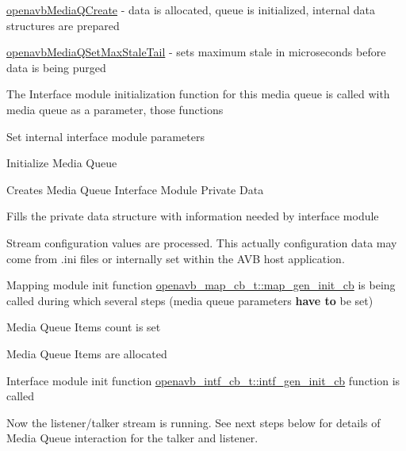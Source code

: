\begin{DoxyItemize}
\item \hyperlink{mediaq_2openavb__mediaq__pub_8h_ad9ac4896a82092d93fb4c21289497194}{openavb\+Media\+Q\+Create} -\/ data is allocated, queue is initialized, internal data structures are prepared
\item \hyperlink{mediaq_2openavb__mediaq__pub_8h_abb41c6d762035f1d5e74c91b5ed44f06}{openavb\+Media\+Q\+Set\+Max\+Stale\+Tail} -\/ sets maximum stale in microseconds before data is being purged
\item The Interface module initialization function for this media queue is called with media queue as a parameter, those functions
\begin{DoxyItemize}
\item Set internal interface module parameters
\item Initialize Media Queue
\begin{DoxyItemize}
\item Creates Media Queue Interface Module Private Data
\item Fills the private data structure with information needed by interface module
\end{DoxyItemize}
\end{DoxyItemize}
\item Stream configuration values are processed. This actually configuration data may come from .ini files or internally set within the A\+VB host application.
\item Mapping module init function \hyperlink{structopenavb__map__cb__t_ae2e9b66edaa11de03638bbcc5f8414bf}{openavb\+\_\+map\+\_\+cb\+\_\+t\+::map\+\_\+gen\+\_\+init\+\_\+cb} is being called during which several steps (media queue parameters {\bfseries have to} be set)
\begin{DoxyItemize}
\item Media Queue Items count is set
\item Media Queue Items are allocated
\end{DoxyItemize}
\item Interface module init function \hyperlink{structopenavb__intf__cb__t_abdfcb6b35075220160046e97e8c51b34}{openavb\+\_\+intf\+\_\+cb\+\_\+t\+::intf\+\_\+gen\+\_\+init\+\_\+cb} function is called
\end{DoxyItemize}

Now the listener/talker stream is running. See next steps below for details of Media Queue interaction for the talker and listener.

